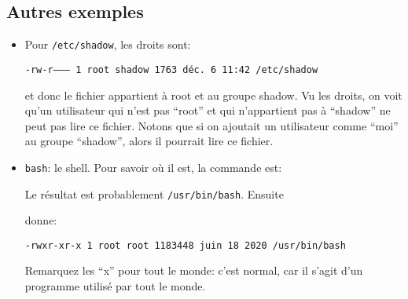 \subsection{Autres exemples}
\begin{itemize}
\item Pour \texttt{/etc/shadow}, les droits sont:

  \begin{center}
  \texttt{-rw-r--------- 1 root shadow 1763 déc. 6 11:42
      /etc/shadow}
  \end{center}
  
  \noindent et donc le fichier appartient à root et au groupe shadow. Vu les
  droits, on voit qu'un utilisateur  qui n'est pas
  ``root'' et qui n'appartient pas à ``shadow'' ne peut pas lire ce
  fichier.
  Notons que si on ajoutait un utilisateur  comme ``moi'' au
  groupe ``shadow'', alors il pourrait lire ce fichier.
  
  \item \texttt{bash}: le shell. Pour savoir où il est, la commande
    est:


    Le résultat est probablement
    \texttt{/usr/bin/bash}. Ensuite 


    donne:

    \texttt{-rwxr-xr-x 1 root root 1183448 juin  18  2020
        /usr/bin/bash}

    Remarquez les ``x'' pour tout le monde: c'est normal, car il
    s'agit d'un programme
    utilisé par tout le monde.
 

\end{itemize}

 
